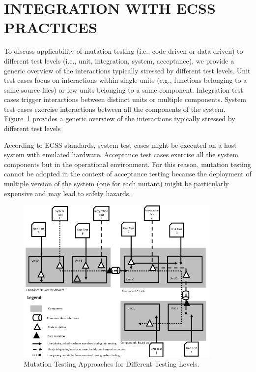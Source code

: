 
\STARTCHANGEDWPT
\section{INTEGRATION WITH ECSS PRACTICES}
\label{sec:isvv}
To discuss applicability of mutation testing (i.e., code-driven or data-driven) to different test levels (i.e., unit, integration, system, acceptance), we provide a generic overview of the interactions typically stressed by different test levels. Unit test cases focus on interactions within single units (e.g., functions belonging to a same source files) or few units belonging to a same component. Integration test cases trigger interactions between distinct units or multiple components. System test cases exercise interactions between all the components of the system.
Figure~\ref{fig:mutationTestingVSTestingLevels} provides a generic overview of the interactions typically stressed by different test levels

According to ECSS standards, system test cases might be executed on a host system with emulated hardware. Acceptance test cases exercise all the system components but in the operational environment. For this reason, mutation testing cannot be adopted in the context of acceptance testing because the deployment of multiple version of the system (one for each mutant) might be particularly expensive and may lead to safety hazards.

\begin{figure}[h]
  \centering
    \includegraphics[width=10cm]{images/TestingLevels}
      \caption{Mutation Testing Approaches for Different Testing Levels.}
      \label{fig:mutationTestingVSTestingLevels}
\end{figure}

